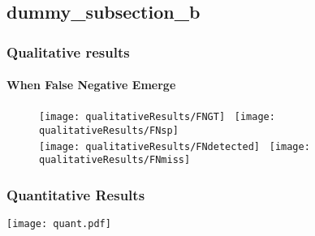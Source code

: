 \subsection{dummy_subsection_b}
\begin{frame}[plain]\frametitle{Qualitative results}
\framesubtitle{When False Negative Emerge}
\vspace{-5pt}
\begin{figure}[Htbp]
\setlength{\abovecaptionskip}{2pt}
\centering
\texttt{[image: qualitativeResults/FNGT]}~ 
\texttt{[image: qualitativeResults/FNsp]}\\ \vspace{3pt}
\texttt{[image: qualitativeResults/FNdetected]}~ 
\texttt{[image: qualitativeResults/FNmiss]}
\end{figure}
\end{frame}


\begin{frame}[plain]\frametitle{Quantitative Results}
\texttt{[image: quant.pdf]} 
\end{frame}
